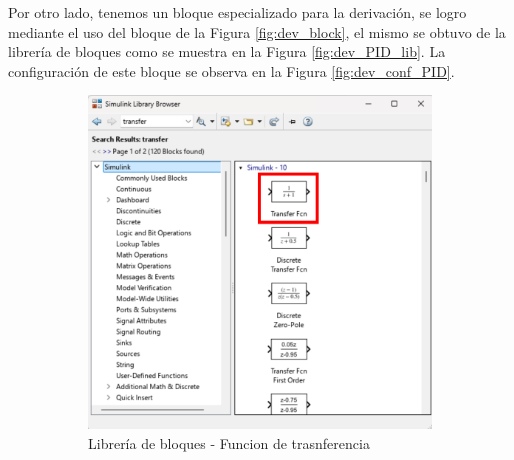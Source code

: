 Por otro lado, tenemos un bloque especializado para la derivación, se logro mediante el uso del bloque de la Figura \ref{fig:dev_block}, el mismo se obtuvo de la librería de bloques como se muestra en la Figura \ref{fig:dev_PID_lib}. La configuración de este bloque se observa en la Figura \ref{fig:dev_conf_PID}. 

\begin{figure}[htbp]
    \centering
    \begin{subfigure}[b]{0.35\textwidth}
        \centering
        \includegraphics[width=\textwidth]{fig/Capitulo5/Caso_de_estudio_PID/Transfer_func.pdf}
        \caption{Librería de bloques - Funcion de trasnferencia}
        \label{fig:tf_func_lib}
    \end{subfigure}
    \hfill
    \begin{subfigure}[b]{0.45\textwidth}
        \centering

\end{subfigure}
\end{figure}
